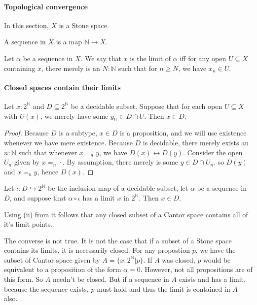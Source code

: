 \paragraph{Topological convergence}
In this section, $X$ is a Stone space. 
\begin{definition}
  A sequence in $X$ is a map $\mathbb N \to X$. 
\end{definition} 
\begin{definition}
  Let $\alpha$ be a sequence in $X$. 
  We say that $x$ is the limit of $\alpha$ iff 
  for any open $U\subseteq X$ containing $x$, 
  there merely is an $N:\mathbb N$ such that for $n \geq N$, we have
  $x_n \in U$. 
\end{definition}

\paragraph{Closed spaces contain their limits}
\begin{lemma}
  Let $x:2^\mathbb N$ and $D\subseteq 2^\mathbb N$ be a decidable subset. 
  Suppose that for each open $U\subseteq X$ with $U(x)$,
  we merely have some $y_U \in D \cap U$. 
  Then $x\in D$. 
\end{lemma}
\begin{proof}
  Because $D$ is a subtype, $x\in D$ is a proposition, and we will use existence whenever we have mere existence.
  Because $D$ is decidable, %
  there merely exists an $n:\mathbb N$ such that 
  whenever $x =_n y$, we have $D(x) \leftrightarrow D(y)$. 
  Consider the open $U_n$ given by $x =_n \cdot $.
  By assumption, there merely is some $y\in D\cap U_n$. 
  so $D(y)$ and $x =_n y$, hence $D(x)$.
\end{proof}
\begin{corollary}
  Let $\iota :D\hookrightarrow 2^\mathbb N$ be the inclusion map of a decidable subset, 
  let $\alpha$ be a sequence in $D$, and 
  suppose that $\alpha\circ \iota$ has a limit $x$ in $2^\mathbb N$. 
  Then $x\in D$. 
\end{corollary}
\begin{corollary}
  Using (ii) from  it follows that any 
  closed subset of a Cantor space contains all of it's limit points. 
\end{corollary}
\begin{remark}
  The converse is not true. It is not the case that if a subset of a Stone space 
  contains its limits, it is necessarily closed. 
  For any propostion $p$, we have the subset of Cantor space given by $A = \{x:2^\mathbb N | p\}$. 
  If $A$ was closed, $p$ would be equivalent to a proposition of the form $\alpha = 0$. 
  However, not all propositions are of this form. So $A$ needn't be closed. 
  But if a sequence in $A$ exists and has a limit, because the sequence exists, $p$ must hold and 
  thus the limit is contained in $A$ also. 
\end{remark}
